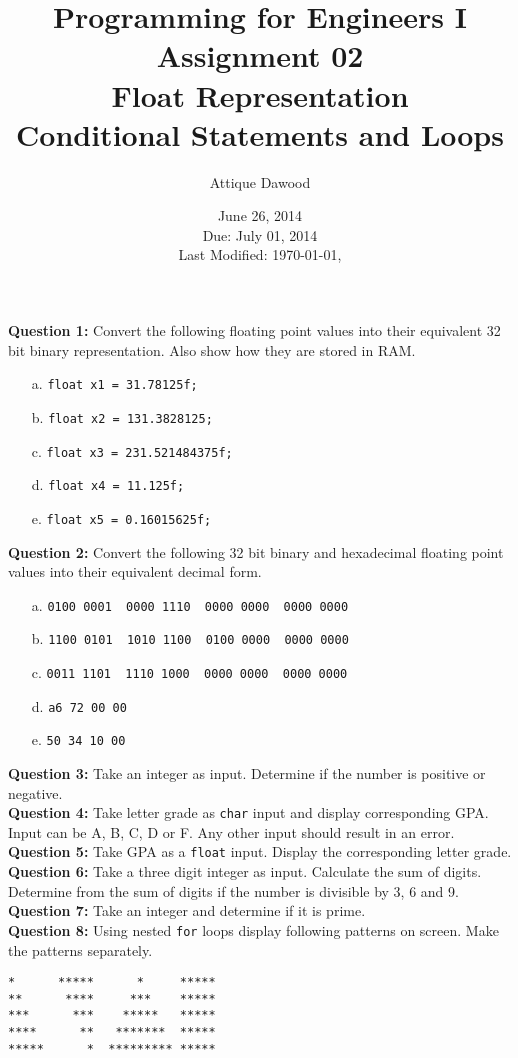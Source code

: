 \documentclass[12pt,a4paper]{article}
\title{Programming for Engineers I\\Assignment 02\\Float Representation\\Conditional Statements and Loops}
\author{Attique Dawood}
\date{June 26, 2014\\Due: July 01, 2014\\[0.2cm] Last Modified: \today, \currenttime}
\begin{document}
\maketitle
\noindent\textbf{Question 1:} Convert the following floating point values into their equivalent 32 bit binary representation. Also show how they are stored in RAM.
\begin{enumerate}
\item[a.] \verb|float x1 = 31.78125f;|
\item[b.] \verb|float x2 = 131.3828125;|
\item[c.] \verb|float x3 = 231.521484375f;|
\item[d.] \verb|float x4 = 11.125f;|
\item[e.] \verb|float x5 = 0.16015625f;|
\end{enumerate}
\noindent\textbf{Question 2:} Convert the following 32 bit binary and hexadecimal floating point values into their equivalent decimal form.
\begin{enumerate}
\item[a.] \verb|0100 0001  0000 1110  0000 0000  0000 0000|
\item[b.] \verb|1100 0101  1010 1100  0100 0000  0000 0000|
\item[c.] \verb|0011 1101  1110 1000  0000 0000  0000 0000|
\item[d.] \verb|a6 72 00 00|
\item[e.] \verb|50 34 10 00|
\end{enumerate}
\noindent\textbf{Question 3:} Take an integer as input. Determine if the number is positive or negative.\\
\noindent\textbf{Question 4:} Take letter grade as \verb|char| input and display corresponding GPA. Input can be A, B, C, D or F. Any other input should result in an error.\\
\noindent\textbf{Question 5:} Take GPA as a \verb|float| input. Display the corresponding letter grade.\\
\noindent\textbf{Question 6:} Take a three digit integer as input. Calculate the sum of digits. Determine from the sum of digits if the number is divisible by 3, 6 and 9.\\
\noindent\textbf{Question 7:} Take an integer and determine if it is prime.\\
\noindent\textbf{Question 8:} Using nested \verb|for| loops display following patterns on screen. Make the patterns separately.
\begin{lstlisting}
*      *****      *     *****
**      ****     ***    *****
***      ***    *****   *****
****      **   *******  *****
*****      *  ********* *****
\end{lstlisting}
\end{document}
